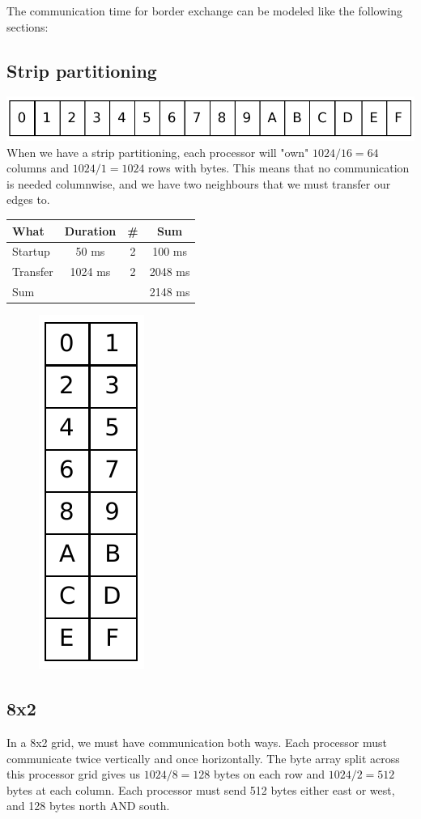 \documentclass[english,a4paper,numbers=noenddot]{scrartcl}
\begin{document}
The communication time for border exchange can be modeled like the following sections:
\subsection{Strip partitioning}
\includegraphics{task3a.pdf}
When we have a strip partitioning, each processor will "own" $1024/16=64$ columns and $1024/1=1024$ rows with bytes. This means that no communication is needed columnwise, and we have two neighbours that we must transfer our edges to.

\begin{tabular}{|l|c|c|c|}
    \hline
    What & Duration & \# & Sum\\
\hline
\hline
Startup & 50 ms & 2 & 100 ms\\
Transfer & 1024 ms & 2 & 2048 ms\\
\hline
Sum & & & 2148 ms\\
\hline
\end{tabular}

\begin{figure}
\includegraphics{task3b.pdf}
\end{figure}
\subsection{8x2}
In a 8x2 grid, we must have communication both ways. Each processor must communicate twice vertically and once horizontally. The byte array split across this processor grid gives us $1024/8=128$ bytes on each row and $1024/2=512$ bytes at each column. Each processor must send 512 bytes either east or west, and 128 bytes north AND south.
\end{document}
